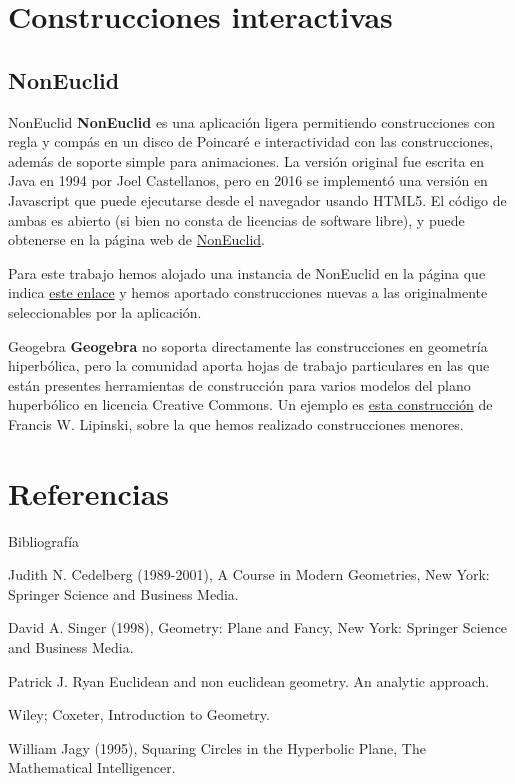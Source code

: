 \documentclass[compress]{beamer}
\begin{document}
\section{Construcciones interactivas}
\subsection{NonEuclid}
\begin{frame}{NonEuclid}
\textbf{NonEuclid} es una aplicación ligera permitiendo construcciones
con regla y compás en un disco de Poincaré e interactividad con las
construcciones, además de soporte simple para animaciones. La versión
original fue escrita en Java en 1994 por Joel Castellanos, pero en
2016 se implementó una versión en Javascript que puede ejecutarse
desde el navegador usando HTML5. El código de ambas es abierto (si
bien no consta de licencias de software libre), y puede obtenerse en
la página web de
\href{https://www.cs.unm.edu/~joel/NonEuclid/NonEuclid.html}{NonEuclid}.

Para este trabajo hemos alojado una instancia de NonEuclid en la
página que indica \href{https://m42.github.io/hiperboloide/}{este
  enlace} y hemos aportado construcciones nuevas a las originalmente
seleccionables por la aplicación.
\end{frame}

\begin{frame}{Geogebra}
\textbf{Geogebra} no soporta directamente las construcciones en geometría
hiperbólica, pero la comunidad aporta hojas de trabajo particulares en las
que están presentes herramientas de construcción para varios modelos del
plano huperbólico en licencia Creative Commons. Un ejemplo es
\href{https://www.geogebra.org/material/show/id/2028857}{esta construcción}
de Francis W. Lipinski, sobre la que hemos realizado construcciones menores.
\end{frame}

\section{Referencias}
\begin{frame}{Bibliografía}
\begin{thebibliography}{9}

  Judith N. Cedelberg (1989-2001),
  A Course in Modern Geometries,
  New York: Springer Science and Business Media.

  David A. Singer (1998),
  Geometry: Plane and Fancy,
  New York: Springer Science and Business Media.

  Patrick J. Ryan
  Euclidean and non euclidean geometry. An analytic approach.

  Wiley; Coxeter,
  Introduction to Geometry.

  William Jagy (1995),
  Squaring Circles in the Hyperbolic Plane,
  The Mathematical Intelligencer.
  
\end{thebibliography}
\end{frame}
\end{document}
